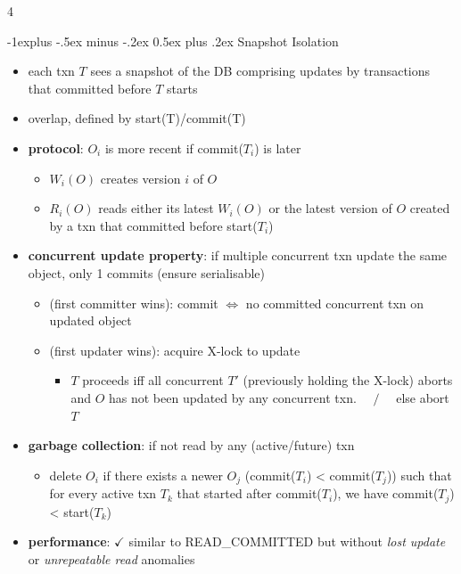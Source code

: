 \documentclass{article}
\makeatletter
\renewcommand{\subsection}{\@startsection{subsection}{2}{0mm}%
    {-1explus -.5ex minus -.2ex}%
    {0.5ex plus .2ex}%
{\normalfont\footnotesize\bfseries}}
\makeatother
\begin{document}
\begin{multicols*}{4}
\begin{scriptsize}
  \subsection{Snapshot Isolation}

  \begin{itemize}
    \item each txn $T$ sees a snapshot of the DB comprising updates by transactions that committed before $T$ starts
    \item {} overlap, defined by start(T)/commit(T)
    \item \textbf{protocol}: $O_i$ is more recent if commit($T_i$) is later
      \begin{itemize}
        \item $W_i(O)$ creates version $i$ of $O$ 
        \item $R_i(O)$ reads either its latest $W_i(O)$ or the latest version of $O$ created by a txn that committed before start($T_i$)
      \end{itemize}
    \item \textbf{concurrent update property}: if multiple concurrent txn update the same object, only 1 commits (ensure serialisable)
      \begin{itemize}
        \item {} (first committer wins): commit $\iff$ no committed concurrent txn on updated object
        \item {} (first updater wins): acquire X-lock to update
          \begin{itemize}
            \item $T$ proceeds iff all concurrent $T'$ (previously holding the X-lock) aborts and $O$ has not been updated by any concurrent txn. $\quad/\quad$ else abort $T$
          \end{itemize}
      \end{itemize}
    \item \textbf{garbage collection}: if not read by any (active/future) txn
      \begin{itemize}
        \item delete $O_i$ if there exists a newer $O_j$ (commit($T_i$) < commit($T_j$)) such that for every active txn $T_k$ that started after commit($T_i$),  we have commit($T_j$) < start($T_k$)
      \end{itemize}
    \item \textbf{performance}: $\checkmark$ similar to READ\_COMMITTED but without \textit{lost update} or \textit{unrepeatable read} anomalies

\end{itemize}
\end{scriptsize}
\end{multicols*}
\end{document}
